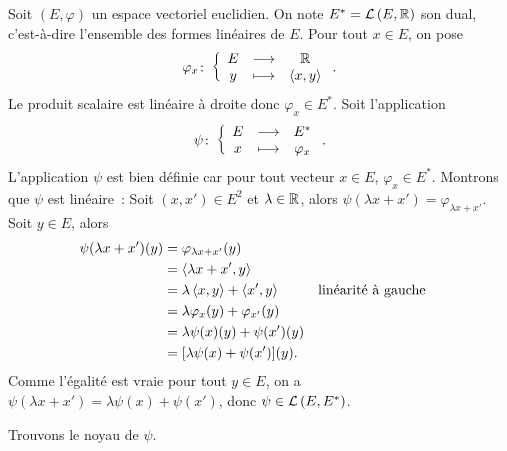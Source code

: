     Soit \((E,\varphi)\) un espace vectoriel euclidien. On note \(E^*=\mathcal{L}\left(E,\mathbb{R}\right)\) son dual, c'est-à-dire l'ensemble des formes linéaires de \(E\). Pour tout \(x \in E\), on pose
    \begin{equation}
      \varphi_x\colon \left\{\begin{array}{ccc} E & \longrightarrow &\mathbb{R}\\ y & \longmapsto & \left\langle{x},{y}\right\rangle \end{array} \right..
    \end{equation}
    Le produit scalaire est linéaire à droite donc \(\varphi_x \in E^*\). Soit l'application
    \begin{equation}
      \psi\colon \left\{\begin{array}{ccc} E & \longrightarrow &E^*\\ x & \longmapsto & \varphi_x \end{array} \right..
    \end{equation}
    L'application \(\psi\) est bien définie car pour tout vecteur \(x \in E\), \(\varphi_x \in E^*\). Montrons que \(\psi\) est linéaire~: Soit \((x,x') \in E^2\) et \(\lambda \in \mathbb{R}\), alors \(\psi(\lambda x+x') = \varphi_{\lambda x+x'}\). Soit \(y \in E\), alors
    \begin{align}
      \psi(\lambda x+x')(y) &= \varphi_{\lambda x+x'}(y) \\
                            &=\left\langle{\lambda x+x'},{y}\right\rangle \\
                            &=\lambda \left\langle{x},{y}\right\rangle + \left\langle{x'},{y}\right\rangle && \text{linéarité à gauche}\\
                            &=\lambda \varphi_x(y)+ \varphi_{x'}(y) \\
                            &=\lambda \psi(x)(y)+\psi(x')(y)\\
                            &=[\lambda \psi(x)+\psi(x')](y).
    \end{align}
    Comme l'égalité est vraie pour tout \(y \in E\), on a \(\psi(\lambda x+x')=\lambda \psi(x)+\psi(x')\), donc \(\psi \in \mathcal{L}\left(E,E^*\right)\).

    Trouvons le noyau de \(\psi\).

